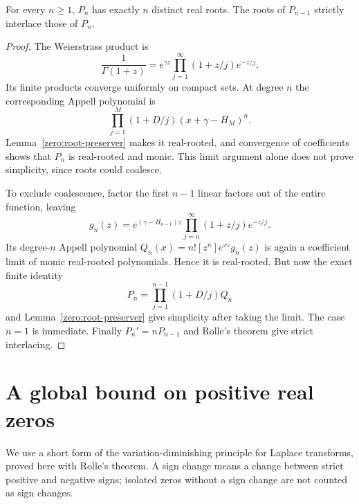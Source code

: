 \begin{theorem}\label{zero:roots}
For every $n\geq1$, $P_n$ has exactly $n$ distinct real roots.
The roots of $P_{n-1}$ strictly interlace those of $P_n$.
\end{theorem}
\begin{proof}
The Weierstrass product \cite{DLMF5} is
\[
 \frac1{\Gamma(1+z)}
   =e^{\gamma z}\prod_{j=1}^{\infty}(1+z/j)e^{-z/j}.
\]
Its finite products converge uniformly on compact sets.  At degree $n$
the corresponding Appell polynomial is
\[
 \prod_{j=1}^{M}(1+D/j)(x+\gamma-H_M)^n.
\]
Lemma~\ref{zero:root-preserver} makes it real-rooted, and convergence
of coefficients shows that $P_n$ is real-rooted and monic.  This limit
argument alone does not prove simplicity, since roots could coalesce.

To exclude coalescence, factor the first $n-1$ linear factors out of
the entire function, leaving
\[
 g_n(z)=e^{(\gamma-H_{n-1})z}
             \prod_{j=n}^{\infty}(1+z/j)e^{-z/j}.
\]
Its degree-$n$ Appell polynomial $Q_n(x)=n![z^n]e^{xz}g_n(z)$ is
again a coefficient limit of monic real-rooted polynomials.  Hence it
is real-rooted.  But now the exact finite identity
\[
 P_n=\prod_{j=1}^{n-1}(1+D/j)Q_n
\]
and Lemma~\ref{zero:root-preserver} give simplicity after taking
the limit.  The case $n=1$ is immediate.  Finally
$P_n'=nP_{n-1}$ and Rolle's theorem give strict interlacing.
\end{proof}

\section{A global bound on positive real zeros}
\label{zero:count-section}

We use a short form of the variation-diminishing principle for Laplace
transforms, proved here with Rolle's theorem.  A sign change means a
change between strict positive and negative signs; isolated zeros
without a sign change are not counted as sign changes.

